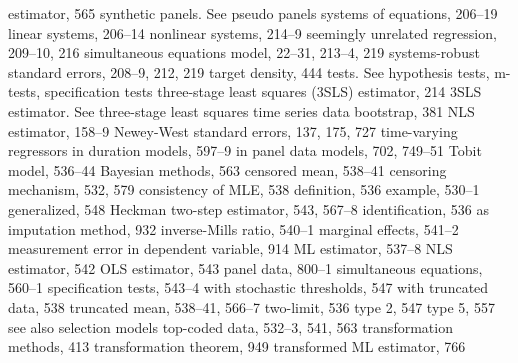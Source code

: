 estimator, 565
synthetic panels. See pseudo panels systems of equations, 206–19
linear systems, 206–14
nonlinear systems, 214–9
seemingly unrelated regression, 209–10, 216 simultaneous equations model, 22–31, 213–4, 219
systems-robust standard errors, 208–9, 212, 219
target density, 444
tests. See hypothesis tests, m-tests, specification tests three-stage least squares (3SLS) estimator, 214 3SLS estimator. See three-stage least squares
time series data
bootstrap, 381
NLS estimator, 158–9
Newey-West standard errors, 137, 175, 727
time-varying regressors
in duration models, 597–9
in panel data models, 702, 749–51
Tobit model, 536–44
Bayesian methods, 563 censored mean, 538–41 censoring mechanism, 532, 579 consistency of MLE, 538 definition, 536
example, 530–1
generalized, 548
Heckman two-step estimator, 543, 567–8 identification, 536
as imputation method, 932
inverse-Mills ratio, 540–1
marginal effects, 541–2
measurement error in dependent variable, 914 ML estimator, 537–8
NLS estimator, 542
OLS estimator, 543
panel data, 800–1
simultaneous equations, 560–1
specification tests, 543–4
with stochastic thresholds, 547
with truncated data, 538
truncated mean, 538–41, 566–7
two-limit, 536
type 2, 547
type 5, 557
see also selection models
top-coded data, 532–3, 541, 563 transformation methods, 413 transformation theorem, 949 transformed ML estimator, 766

